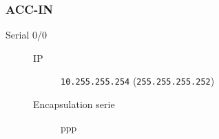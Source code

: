 \subsubsection{ACC-IN}

	\begin{description}
		\item[Serial 0/0] 
		\begin{description}
			\item[IP] \texttt{10.255.255.254} (\texttt{255.255.255.252})
			\item[Encapsulation serie] ppp
		\end{description}

	\end{description}
	
	\clearpage
